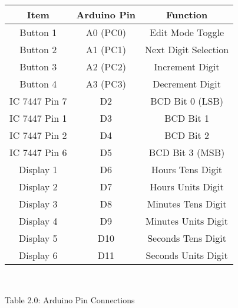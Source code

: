\centering
\begin{tabular}{|c|c|c|}
\hline
Item & Arduino Pin & Function\\
\hline
Button 1 & A0 (PC0) & Edit Mode Toggle\\
\hline
Button 2 & A1 (PC1) & Next Digit Selection\\
\hline
Button 3 & A2 (PC2) & Increment Digit\\
\hline
Button 4 & A3 (PC3) & Decrement Digit\\
\hline
IC 7447 Pin 7 & D2 & BCD Bit 0 (LSB)\\
\hline
IC 7447 Pin 1 & D3 & BCD Bit 1\\
\hline
IC 7447 Pin 2 & D4 & BCD Bit 2\\
\hline
IC 7447 Pin 6 & D5 & BCD Bit 3 (MSB)\\
\hline
Display 1  & D6 & Hours Tens Digit\\
\hline
Display 2  & D7 & Hours Units Digit\\
\hline
Display 3  & D8 & Minutes Tens Digit\\
\hline
Display 4  & D9 & Minutes Units Digit\\
\hline
Display 5 & D10 & Seconds Tens Digit\\
\hline
Display 6  & D11 & Seconds Units Digit\\
\hline
\end{tabular}\\
\centerline{Table 2.0: Arduino Pin Connections}
